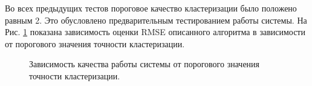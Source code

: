 \documentclass[a4paper, 12pt]{article} %
\begin{document}
	Во всех предыдущих тестов пороговое качество кластеризации было положено равным 2. Это обусловлено предварительным тестированием работы системы. На Рис. \ref{fig:accuraccur} показана зависимость оценки RMSE описанного алгоритма в зависимости от порогового значения точности кластеризации. 
	
	\begin{figure}[h]
	\begin{minipage}[h]{0.49\linewidth}
	\end{minipage}
	\hfill
	\begin{minipage}[h]{0.49\linewidth}
	\end{minipage}
	\caption{Зависимость качества работы системы от порогового значения точности кластеризации.}
	\label{fig:accuraccur}
	\end{figure}
\end{document}
